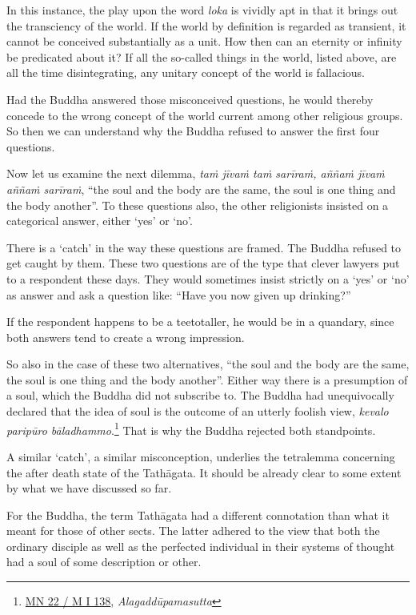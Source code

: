 In this instance, the play upon the word \emph{loka} is vividly apt in that it brings out the transciency of the world. If the world by definition is regarded as transient, it cannot be conceived substantially as a unit. How then can an eternity or infinity be predicated about it? If all the so-called things in the world, listed above, are all the time disintegrating, any unitary concept of the world is fallacious.

Had the Buddha answered those misconceived questions, he would thereby concede to the wrong concept of the world current among other religious groups. So then we can understand why the Buddha refused to answer the first four questions.

Now let us examine the next dilemma, \emph{taṁ jīvaṁ taṁ sarīraṁ, aññaṁ jīvaṁ aññaṁ sarīraṁ}, ``the soul and the body are the same, the soul is one thing and the body another''. To these questions also, the other religionists insisted on a categorical answer, either `yes' or `no'.

There is a `catch' in the way these questions are framed. The Buddha refused to get caught by them. These two questions are of the type that clever lawyers put to a respondent these days. They would sometimes insist strictly on a `yes' or `no' as answer and ask a question like: ``Have you now given up drinking?''

If the respondent happens to be a teetotaller, he would be in a quandary, since both answers tend to create a wrong impression.

So also in the case of these two alternatives, ``the soul and the body are the same, the soul is one thing and the body another''. Either way there is a presumption of a soul, which the Buddha did not subscribe to. The Buddha had unequivocally declared that the idea of soul is the outcome of an utterly foolish view, \emph{kevalo paripūro bāladhammo}.\footnote{\href{https://suttacentral.net/mn22/pli/ms}{MN 22 / M I 138}, \emph{Alagaddūpamasutta}} That is why the Buddha rejected both standpoints.

A similar `catch', a similar misconception, underlies the tetralemma concerning the after death state of the Tathāgata. It should be already clear to some extent by what we have discussed so far.

For the Buddha, the term Tathāgata had a different connotation than what it meant for those of other sects. The latter adhered to the view that both the ordinary disciple as well as the perfected individual in their systems of thought had a soul of some description or other.

